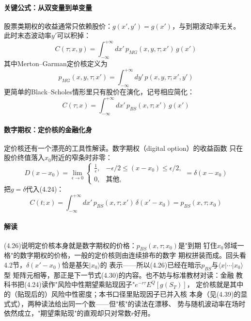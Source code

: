 \paragraph{关键公式：从双变量到单变量}
股票类期权的收益通常只依赖股价：$g(x',y')=g(x')$，与到期波动率无关。
此时末态波动率$y'$可以积掉：
\begin{equation*}
C(\tau;x,y)=\int_{-\infty}^{+\infty}dx'\,
p_{MG}(x,y,\tau;x')\,g(x')
\tag{4.22}
\end{equation*}
其中Merton--Garman定价核定义为
\begin{equation*}
p_{MG}(x,y,\tau;x')=\int_{-\infty}^{+\infty}dy'\,
p(x,y,\tau;x',y')
\tag{4.23}
\end{equation*}
更简单的Black--Scholes情形里只有股价在演化，记号相应简化：
\begin{equation*}
C(\tau;x)=\int_{-\infty}^{+\infty}dx'\,
p_{BS}(x,\tau;x')\,g(x')
\tag{4.24}
\end{equation*}

\paragraph{数字期权：定价核的金融化身}
定价核还有一个漂亮的工具性解读。数字期权（digital option）的收益函数
只在股价终值落入$x_0$附近的窄条时非零：
\begin{equation*}
D(x-x_{0})=\lim_{\epsilon\to0}
\begin{cases}
\frac{1}{\epsilon}, & -\epsilon/2\leq(x-x_{0})\leq\epsilon/2,\\
0, & \text{其他},
\end{cases}
=\delta(x-x_{0})
\end{equation*}
把$g=\delta$代入(4.24)：
\begin{equation*}
C(t;x)=\int_{-\infty}^{+\infty}dx'\,
p_{BS}(x,\tau;x')\,\delta(x'-x_{0})
=p_{BS}(x,\tau;x_{0})
\tag{4.26}
\end{equation*}

\paragraph{解读}
(4.26)说明定价核本身就是数字期权的价格：$p_{BS}(x,\tau;x_{0})$是"到期
钉住$x_{0}$邻域一格"的数字期权的价格，一般的定价核则由连续排布的数字
期权拼装而成。回头看4.2节，$\delta(x'-x_{0})$恰是基矢$|x_{0}\rangle$的
表示——所以(4.26)已经在暗示$p_{BS}$与$\langle x|\cdots|x_{0}\rangle$型
矩阵元相等，那正是下一节式(4.30)的内容。也不妨与标准教材对读：金融
教科书把(4.24)读作"风险中性期望乘贴现因子"$e^{-r\tau}E^{Q}[g(S_{T})]$，
定价核就是其中的（贴现后的）风险中性密度；本书口径里贴现因子已并入核
本身（见(4.39)的显式式），两种读法给出同一个数——但"核"的读法在漂移、
势与随机波动率在场时依然成立，"期望乘贴现"的直观却只对常数$r$好用。

